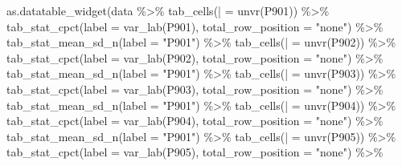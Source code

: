 \documentclass[
]{book}
\newenvironment{Shaded}{\begin{snugshade}}{\end{snugshade}}
\newcommand{\AttributeTok}[1]{\textcolor[rgb]{0.77,0.63,0.00}{#1}}
\newcommand{\FunctionTok}[1]{\textcolor[rgb]{0.00,0.00,0.00}{#1}}
\newcommand{\NormalTok}[1]{#1}
\newcommand{\OtherTok}[1]{\textcolor[rgb]{0.56,0.35,0.01}{#1}}
\newcommand{\SpecialCharTok}[1]{\textcolor[rgb]{0.00,0.00,0.00}{#1}}
\newcommand{\StringTok}[1]{\textcolor[rgb]{0.31,0.60,0.02}{#1}}
\begin{document}
\begin{Shaded}
\begin{Highlighting}[]
\FunctionTok{as.datatable\_widget}\NormalTok{(data }\SpecialCharTok{\%\textgreater{}\%} \FunctionTok{tab\_cells}\NormalTok{(}\StringTok{\textasciigrave{}}\AttributeTok{|}\StringTok{\textasciigrave{}} \OtherTok{=} \FunctionTok{unvr}\NormalTok{(P901)) }\SpecialCharTok{\%\textgreater{}\%} 
  \FunctionTok{tab\_stat\_cpct}\NormalTok{(}\AttributeTok{label =} \FunctionTok{var\_lab}\NormalTok{(P901), }\AttributeTok{total\_row\_position =} \StringTok{"none"}\NormalTok{) }\SpecialCharTok{\%\textgreater{}\%} 
  \FunctionTok{tab\_stat\_mean\_sd\_n}\NormalTok{(}\AttributeTok{label =} \StringTok{"P901"}\NormalTok{) }\SpecialCharTok{\%\textgreater{}\%} \FunctionTok{tab\_cells}\NormalTok{(}\StringTok{\textasciigrave{}}\AttributeTok{|}\StringTok{\textasciigrave{}} \OtherTok{=} \FunctionTok{unvr}\NormalTok{(P902)) }\SpecialCharTok{\%\textgreater{}\%} 
  \FunctionTok{tab\_stat\_cpct}\NormalTok{(}\AttributeTok{label =} \FunctionTok{var\_lab}\NormalTok{(P902), }\AttributeTok{total\_row\_position =} \StringTok{"none"}\NormalTok{) }\SpecialCharTok{\%\textgreater{}\%} 
  \FunctionTok{tab\_stat\_mean\_sd\_n}\NormalTok{(}\AttributeTok{label =} \StringTok{"P901"}\NormalTok{) }\SpecialCharTok{\%\textgreater{}\%} \FunctionTok{tab\_cells}\NormalTok{(}\StringTok{\textasciigrave{}}\AttributeTok{|}\StringTok{\textasciigrave{}} \OtherTok{=} \FunctionTok{unvr}\NormalTok{(P903)) }\SpecialCharTok{\%\textgreater{}\%} 
  \FunctionTok{tab\_stat\_cpct}\NormalTok{(}\AttributeTok{label =} \FunctionTok{var\_lab}\NormalTok{(P903), }\AttributeTok{total\_row\_position =} \StringTok{"none"}\NormalTok{) }\SpecialCharTok{\%\textgreater{}\%} 
  \FunctionTok{tab\_stat\_mean\_sd\_n}\NormalTok{(}\AttributeTok{label =} \StringTok{"P901"}\NormalTok{) }\SpecialCharTok{\%\textgreater{}\%} \FunctionTok{tab\_cells}\NormalTok{(}\StringTok{\textasciigrave{}}\AttributeTok{|}\StringTok{\textasciigrave{}} \OtherTok{=} \FunctionTok{unvr}\NormalTok{(P904)) }\SpecialCharTok{\%\textgreater{}\%} 
  \FunctionTok{tab\_stat\_cpct}\NormalTok{(}\AttributeTok{label =} \FunctionTok{var\_lab}\NormalTok{(P904), }\AttributeTok{total\_row\_position =} \StringTok{"none"}\NormalTok{) }\SpecialCharTok{\%\textgreater{}\%} 
  \FunctionTok{tab\_stat\_mean\_sd\_n}\NormalTok{(}\AttributeTok{label =} \StringTok{"P901"}\NormalTok{) }\SpecialCharTok{\%\textgreater{}\%} \FunctionTok{tab\_cells}\NormalTok{(}\StringTok{\textasciigrave{}}\AttributeTok{|}\StringTok{\textasciigrave{}} \OtherTok{=} \FunctionTok{unvr}\NormalTok{(P905)) }\SpecialCharTok{\%\textgreater{}\%} 
  \FunctionTok{tab\_stat\_cpct}\NormalTok{(}\AttributeTok{label =} \FunctionTok{var\_lab}\NormalTok{(P905), }\AttributeTok{total\_row\_position =} \StringTok{"none"}\NormalTok{) }\SpecialCharTok{\%\textgreater{}\%} 

\end{Highlighting}
\end{Shaded}
\end{document}
